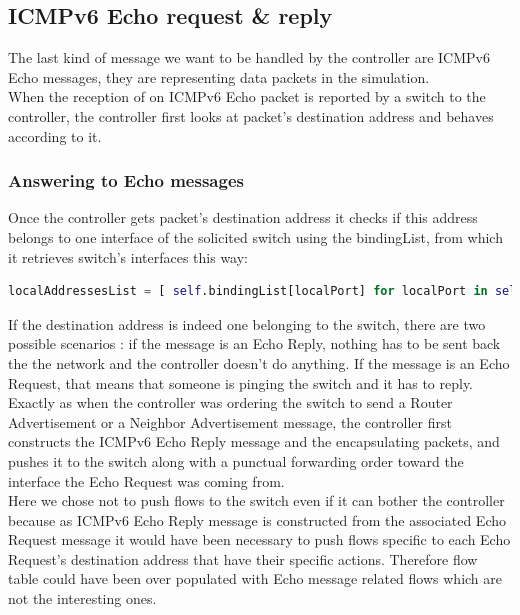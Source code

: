 \documentclass{article}
\begin{document}
\subsection{ICMPv6 Echo request \& reply}

The last kind of message we want to be handled by the controller are
ICMPv6 Echo messages, they are representing data packets in the
simulation.\\
When the reception of on ICMPv6 Echo packet is reported
by a switch to the controller, the controller first looks at packet's
destination address and behaves according to it.

\subsubsection{Answering to Echo messages}
Once the controller gets packet's destination address it checks if
this address belongs to one interface of the solicited switch using
the bindingList, from which it retrieves switch's interfaces this way:

\begin{lstlisting}[frame=single,language=Python, breaklines=true] 
localAddressesList = [ self.bindingList[localPort] for localPort in self.bindingList.keys() if localPort[0]==dpid ]
\end{lstlisting}

If the destination address is indeed one belonging to the switch,
there are two possible scenarios : if the message is an Echo Reply,
nothing has to be sent back the the network and the controller
doesn't do anything. If the message is an Echo Request, that means
that someone is pinging the switch and it has to reply.\\
\newline
Exactly as when the controller was ordering the switch to send a
Router Advertisement or a Neighbor Advertisement message, the
controller first constructs the ICMPv6 Echo Reply message and the
encapsulating packets, and pushes it to the switch along with a
punctual forwarding order toward the interface the Echo Request was
coming from.\\
\newline
Here we chose not to push flows to the switch even if it can bother
the controller because as ICMPv6 Echo Reply message is constructed from
the associated Echo Request message it would have been necessary to
push flows specific to each Echo Request's destination address that
have their specific actions. Therefore flow table could have been
over populated with Echo message related flows which are not the
interesting ones.
\end{document}
